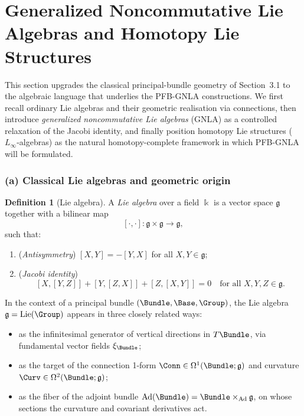 \documentclass[11pt]{book}
\theoremstyle{plain}
\theoremstyle{definition}
\newtheorem{definition}[theorem]{Definition} \theoremstyle{remark}
\begin{document}
\section{Generalized Noncommutative Lie Algebras and Homotopy Lie Structures}


This section upgrades the classical principal-bundle geometry of
Section~3.1 to the algebraic language that underlies the PFB-GNLA
constructions. We first recall ordinary Lie algebras and their geometric
realisation via connections, then introduce \emph{generalized
noncommutative Lie algebras} (GNLA) as a controlled relaxation of the
Jacobi identity, and finally position homotopy Lie structures
($L_\infty$-algebras) as the natural homotopy-complete framework in
which PFB-GNLA will be formulated.



\subsubsection*{(a) Classical Lie algebras and geometric origin}

\begin{definition}[Lie algebra]
A \emph{Lie algebra} over a field $\Bbbk$ is a vector space
  $\mathfrak{g}$ together with a bilinear map
  \[
     [\cdot,\cdot]:
       \mathfrak{g}\times\mathfrak{g}\longrightarrow\mathfrak{g},
  \]
  such that:
  \begin{enumerate}[label=\roman*)]
    \item (\emph{Antisymmetry})
          $[X,Y]=-[Y,X]$ for all $X,Y\in\mathfrak{g}$;
    \item (\emph{Jacobi identity})
          \[
             [X,[Y,Z]] + [Y,[Z,X]] + [Z,[X,Y]] = 0
             \quad
             \text{for all }X,Y,Z\in\mathfrak{g}.
          \]
  \end{enumerate}
\end{definition}

In the context of a principal bundle $(\Bundle,\Base,\Group)$, the Lie
algebra $\mathfrak{g}=\mathrm{Lie}(\Group)$ appears in three closely
related ways:

\begin{itemize}
  \item as the infinitesimal generator of vertical directions in
        $T\Bundle$, via fundamental vector fields $\xi_\Bundle$;
  \item as the target of the connection 1-form
        $\Conn\in\Omega^1(\Bundle;\mathfrak{g})$ and curvature
        $\Curv\in\Omega^2(\Bundle;\mathfrak{g})$;
  \item as the fiber of the adjoint bundle
        $\mathrm{Ad}(\Bundle)=\Bundle\times_{\mathrm{Ad}}\mathfrak{g}$,
        on whose sections the curvature and covariant derivatives act.
\end{itemize}
\end{document}
